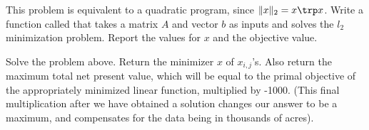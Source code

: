 This problem is equivalent to a quadratic program, since $\|x\|_2 = x\trp x$.
Write a function called  that takes a matrix $A$ and vector $b$ as inputs and solves the $l_2$ minimization problem.
Report the values for $x$ and the objective value. 

Solve the problem above. 
Return the minimizer $x$ of $x_{i,j}$'s. 
Also return the maximum total net present value, which will be equal to the primal objective of the appropriately minimized linear function, multiplied by -1000. 
(This final multiplication after we have obtained a solution changes our answer to be a maximum, and compensates for the data being in thousands of acres).
